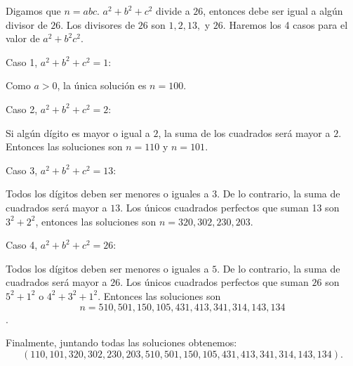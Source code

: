 Digamos que $n=abc$. $a^2+b^2+c^2$ divide a $26$, entonces debe ser igual a algún divisor de $26$. Los divisores de $26$ son 
$1,2,13,$ y $26$. Haremos los 4 casos para el valor de $a^2+b^2c^2$.

Caso 1, $a^2+b^2+c^2=1$:

Como $a>0$, la única solución es $n=100$.

Caso 2, $a^2+b^2+c^2=2$:

Si algún dígito es mayor o igual a $2$, la suma de los cuadrados será mayor a $2$. Entonces las 
soluciones son $n=110$ y $n=101$.

Caso 3, $a^2+b^2+c^2=13$:

Todos los dígitos deben ser menores o iguales a $3$. De lo contrario, la suma de cuadrados será 
mayor a $13$. Los únicos cuadrados perfectos que suman 13 son $3^2+2^2$, entonces las soluciones son $n=320,302,230,203$. 

Caso 4, $a^2+b^2+c^2=26$:

Todos los dígitos deben ser menores o iguales a $5$. De lo contrario, la suma de cuadrados será 
mayor a $26$. Los únicos cuadrados perfectos que suman $26$ son $5^2+1^2$ o $4^2+3^2+1^2$. Entonces las soluciones son 
\[n=510,501,150,105,431,413,341,314,143,134\].

Finalmente, juntando todas las soluciones obtenemos:
\[(110,101,320,302,230,203,510,501,150,105,431,413,341,314,143,134).\]
